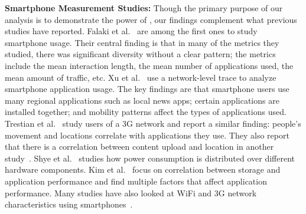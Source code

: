 {\bf Smartphone Measurement Studies:}
Though the primary purpose of our analysis is to demonstrate the power of
\PhoneLab{}, our findings complement what previous studies have reported. Falaki
et al.~\cite{falaki:mobisys:2010} are among the first ones to study smartphone
usage. Their central finding is that in many of the metrics they studied, there
was significant diversity without a clear pattern; the metrics include the mean
interaction length, the mean number of applications used, the mean amount of
traffic, etc. Xu et al.~\cite{xu:imc:2011} use a network-level trace to analyze
smartphone application usage. The key findings are that smartphone users use
many regional applications such as local news apps; certain applications are
installed together; and mobility patterns affect the types of applications
used. Trestian et al.~\cite{trestian:imc:2009} study users of a 3G network and
report a similar finding: people's movement and locations correlate with
applications they use. They also report that there is a correlation between
content upload and location in another study~\cite{trestian:ton:2012}. Shye et
al.~\cite{shye:micro:2009} studies how power consumption is distributed over
different hardware components. Kim et al.~\cite{kim:fast:2012} focus on
correlation between storage and application performance and find multiple
factors that affect application performance. Many studies have also looked at
WiFi and 3G network characteristics using
smartphones~\cite{keralapura:mobicom:2010, maier:pam:2010, gember:pam:2011}.

